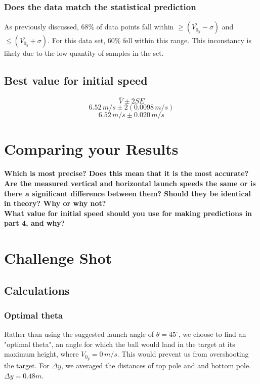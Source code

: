 \documentclass[11pt, letterpaper, includehead]{article}
\begin{document}
\subsubsection{Does the data match the statistical prediction} 
As previously discussed, $68\%$ of 
data points fall within $\geq (\bar{V_{0_y}} - \sigma)$ and $\leq (\bar{V_{0_y}} + \sigma)$. 
For this data set, $60\%$ fell within this range. This inconstancy is likely due to the 
low quantity of samples in the set. 

\subsection{Best value for initial speed} %
$$\bar{V} \pm 2SE$$
$$6.52\, m/s \pm 2( 0.0098 \, m/s)$$
$$\boxed{6.52\, m/s \pm 0.020 \, m/s}$$

\section{Comparing your Results} %
\textbf{Which is most precise? Does this mean that it is the most accurate?}\\ 

\textbf{Are the measured vertical and horizontal launch speeds the same or is there a
significant difference between them? Should they be identical in theory? Why or
why not?}\\

\textbf{What value for initial speed should you use for making predictions in part 4, and
why?}

\section{Challenge Shot} %
\subsection{Calculations} %
\subsubsection{Optimal theta} %
Rather than using the suggested launch angle of $\theta = 45^{\circ}$, we choose
to find an "optimal theta", an angle for which the ball would land in the 
target at its maximum height, where $V_{0_y} = 0\,m/s$. This would prevent us from 
overshooting the target. For $\Delta y$, we averaged the 
distances of top pole and and bottom pole. $\Delta y = 0.48m$.
\end{document}
